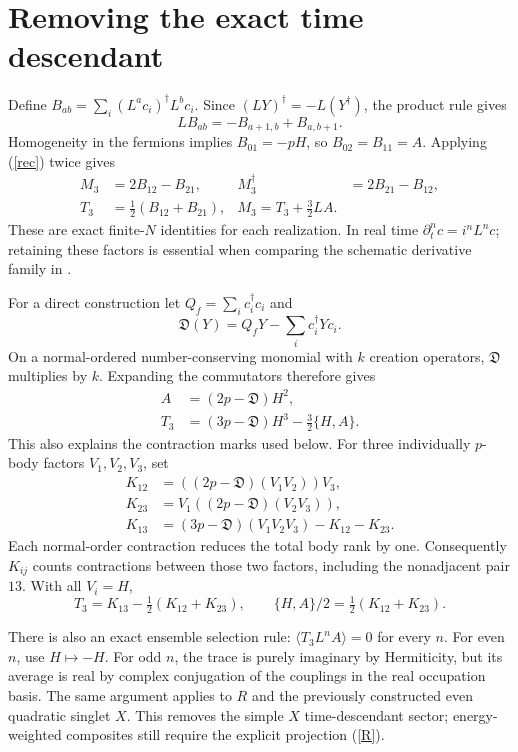 \documentclass[11pt,a4paper]{article}
\newcommand{\av}[1]{\langle #1\rangle}
\begin{document}
\newpage
\section{Removing the exact time descendant}
Define $B_{ab}=\sum_i(L^ac_i)^\dagger L^bc_i$. Since
$(LY)^\dagger=-L(Y^\dagger)$, the product rule gives
\begin{equation}
 LB_{ab}=-B_{a+1,b}+B_{a,b+1}.                           \label{rec}
\end{equation}
Homogeneity in the fermions implies $B_{01}=-pH$, so
$B_{02}=B_{11}=A$. Applying (\ref{rec}) twice gives
\begin{align}
 M_3&=2B_{12}-B_{21},&
 M_3^\dagger&=2B_{21}-B_{12},\\
 T_3&=\tfrac12(B_{12}+B_{21}),&
 \boxed{M_3=T_3+\tfrac32 LA.}                         \label{split}
\end{align}
These are exact finite-$N$ identities for each realization. In real
time $\partial_t^n c=i^nL^nc$; retaining these factors is essential
when comparing the schematic derivative family in \cite{MSS}.

For a direct construction let $Q_f=\sum_i c_i^\dagger c_i$ and
\[
 \mathfrak D(Y)=Q_fY-\sum_i c_i^\dagger Yc_i .
\]
On a normal-ordered number-conserving monomial with $k$ creation
operators, $\mathfrak D$ multiplies by $k$. Expanding the commutators
therefore gives
\begin{align}
 A&=(2p-\mathfrak D)H^2,\\
 T_3&=(3p-\mathfrak D)H^3-\tfrac32\{H,A\}.             \label{rank}
\end{align}
This also explains the contraction marks used below. For three
individually $p$-body factors $V_1,V_2,V_3$, set
\begin{align}
 K_{12}&=((2p-\mathfrak D)(V_1V_2))V_3,\\
 K_{23}&=V_1((2p-\mathfrak D)(V_2V_3)),\\
 K_{13}&=(3p-\mathfrak D)(V_1V_2V_3)-K_{12}-K_{23}.
\end{align}
Each normal-order contraction reduces the total body rank by one.
Consequently $K_{ij}$ counts contractions between those two factors,
including the nonadjacent pair $13$. With all $V_i=H$,
\begin{equation}
 T_3=K_{13}-\tfrac12(K_{12}+K_{23}),\qquad
 \{H,A\}/2=\tfrac12(K_{12}+K_{23}).                    \label{marks}
\end{equation}

There is also an exact ensemble selection rule:
$\av{T_3L^nA}=0$ for every $n$. For even $n$, use $H\mapsto-H$.
For odd $n$, the trace is purely imaginary by Hermiticity, but its
average is real by complex conjugation of the couplings in the real
occupation basis. The same argument applies to $R$ and the previously
constructed even quadratic singlet $X$. This removes the simple
$X$ time-descendant sector; energy-weighted composites still require
the explicit projection (\ref{R}).
\end{document}
